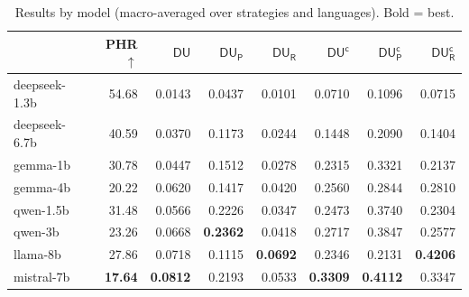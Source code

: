 \begin{table}[ht]
\centering
\small
\caption{Results by model (macro-averaged over strategies and languages). Bold = best.}
\label{tab:by_model}
\begin{tabular}{lrrrrrrr}
\toprule
 & PHR$\uparrow$ & $\mathsf{DU}$ & $\mathsf{DU_P}$ & $\mathsf{DU_R}$ & $\mathsf{DU^c}$ & $\mathsf{DU^c_P}$ & $\mathsf{DU^c_R}$ \\
\midrule
  deepseek-1.3b & 54.68 & 0.0143 & 0.0437 & 0.0101 & 0.0710 & 0.1096 & 0.0715 \\
  deepseek-6.7b & 40.59 & 0.0370 & 0.1173 & 0.0244 & 0.1448 & 0.2090 & 0.1404 \\
  gemma-1b & 30.78 & 0.0447 & 0.1512 & 0.0278 & 0.2315 & 0.3321 & 0.2137 \\
  gemma-4b & 20.22 & 0.0620 & 0.1417 & 0.0420 & 0.2560 & 0.2844 & 0.2810 \\
  qwen-1.5b & 31.48 & 0.0566 & 0.2226 & 0.0347 & 0.2473 & 0.3740 & 0.2304 \\
  qwen-3b & 23.26 & 0.0668 & \textbf{0.2362} & 0.0418 & 0.2717 & 0.3847 & 0.2577 \\
  llama-8b & 27.86 & 0.0718 & 0.1115 & \textbf{0.0692} & 0.2346 & 0.2131 & \textbf{0.4206} \\
  mistral-7b & \textbf{17.64} & \textbf{0.0812} & 0.2193 & 0.0533 & \textbf{0.3309} & \textbf{0.4112} & 0.3347 \\
\bottomrule
\end{tabular}
\end{table}